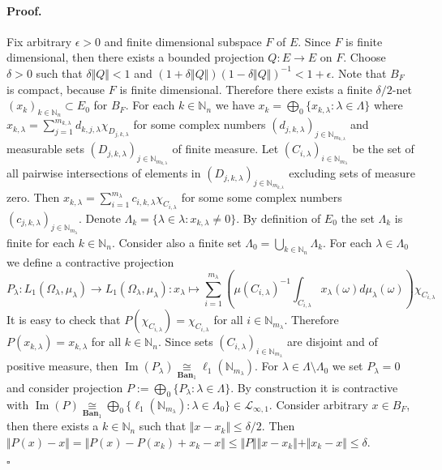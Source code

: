 \documentclass[12pt]{article}
\newcommand{\isom}[1]{\mathop{\mathbin{\cong}}\limits_{#1}}
\renewenvironment{proof}{\paragraph{Proof.}}{\hfill$\square$\medskip}
\begin{document}
\begin{proof}
    Fix arbitrary $\epsilon>0$ and finite dimensional subspace $F$ of $E$. Since
    $F$ is finite dimensional, then there exists a bounded projection $Q:E\to E$
    on $F$. Choose $\delta>0$ such that $\delta\Vert Q\Vert<1$ and
    $(1+\delta\Vert Q\Vert){(1-\delta\Vert Q\Vert)}^{-1}<1+\epsilon$. Note that
    $B_F$ is compact, because $F$ is finite dimensional. Therefore there exists
    a finite $\delta/2$-net ${(x_k)}_{k\in\mathbb{N}_n}\subset E_0$ for $B_F$.
    For each $k\in\mathbb{N}_n$ we have
    $x_k=\bigoplus_0\{x_{k,\lambda}:\lambda\in\Lambda \}$ where
    $x_{k,\lambda}=
        \sum_{j=1}^{m_{k,\lambda}}d_{k,j,\lambda}\chi_{D_{j,k,\lambda}}$
    for some complex numbers
    ${(d_{j,k,\lambda})}_{j\in\mathbb{N}_{m_{k,\lambda}}}$ and measurable sets
    ${(D_{j,k,\lambda})}_{j\in\mathbb{N}_{m_{k,\lambda}}}$ of finite measure.
    Let ${(C_{i,\lambda})}_{i\in\mathbb{N}_{m_\lambda}}$ be the set of all
    pairwise intersections of elements in
    ${(D_{j,k,\lambda})}_{j\in\mathbb{N}_{m_{k,\lambda}}}$ excluding sets of
    measure zero. Then $x_{k,\lambda}=\sum_{i=1}^{m_\lambda}
        c_{i,k,\lambda}\chi_{C_{i,\lambda}}$ for some some complex numbers
    ${(c_{j,k,\lambda})}_{j\in\mathbb{N}_{m_{\lambda}}}$. Denote
    $\Lambda_k=\{\lambda\in\lambda:x_{k,\lambda}\neq 0\}$. By definition of
    $E_0$ the set $\Lambda_k$ is finite for each $k\in\mathbb{N}_n$. Consider
    also a finite set $\Lambda_0=\bigcup_{k\in\mathbb{N}_n}\Lambda_k$. For each
    $\lambda\in\Lambda_0$ we define a contractive projection
    $$
        P_\lambda:L_1(\Omega_\lambda,\mu_\lambda)
        \to
        L_1(\Omega_\lambda,\mu_\lambda):
        x_\lambda\mapsto \sum_{i=1}^{m_\lambda}\left( {\mu(C_{i,\lambda})}^{-1}
        \int_{C_{i,\lambda}}x_\lambda(\omega)d\mu_\lambda(\omega)
        \right)\chi_{C_{i,\lambda}}
    $$
    It is easy to check that $P(\chi_{C_{i,\lambda}})=\chi_{C_{i,\lambda}}$ for
    all $i\in\mathbb{N}_{m_\lambda}$. Therefore $P(x_{k,\lambda})=x_{k,\lambda}$
    for all $k\in\mathbb{N}_n$. Since sets
    ${(C_{i,\lambda})}_{i\in\mathbb{N}_{m_\lambda}}$ are disjoint and of
    positive measure, then
    $\operatorname{Im}(P_\lambda)
        \isom{\mathbf{Ban}_1}
        \ell_1(\mathbb{N}_{m_\lambda})$.
    For $\lambda\in\Lambda\setminus\Lambda_0$ we set $P_\lambda=0$ and consider
    projection $P:=\bigoplus_0\{P_\lambda:\lambda\in\Lambda \}$. By construction
    it is contractive with $\operatorname{Im}(P) \isom{\mathbf{Ban}_1}
        \bigoplus_0\{\ell_1(\mathbb{N}_{m_\lambda}):\lambda\in\Lambda_0\}
        \in\mathcal{L}_{\infty,1}$. Consider arbitrary $x\in B_F$, then
    there exists a
    $k\in\mathbb{N}_n$ such that $\Vert x-x_k\Vert\leq \delta/2$. Then $\Vert
        P(x)-x\Vert=\Vert P(x)-P(x_k)+x_k-x\Vert\leq\Vert P\Vert\Vert
        x-x_k\Vert+\Vert x_k-x\Vert\leq\delta$.


\end{proof}
\end{document}
